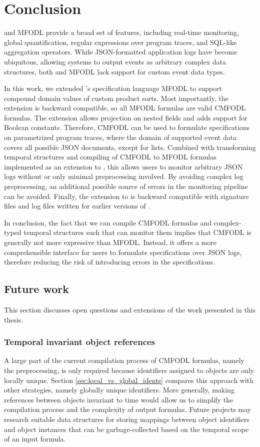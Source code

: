 \chapter{Conclusion}

\MonPoly and MFODL provide a broad set of features, including real-time monitoring, global quantification, regular expressions over program traces, and SQL-like aggregation operators. While JSON-formatted application logs have become ubiquitous, allowing systems to output events as arbitrary complex data structures, both \MonPoly and MFODL lack support for custom event data types.

In this work, we extended \MonPoly's specification language MFODL to support compound domain values of custom product sorts. Most importantly, the extension is backward compatible, so all MFODL formulas are valid CMFODL formulas. The extension allows projection on nested fields and adds support for Boolean constants. Therefore, CMFODL can be used to formulate specifications on parametrized program traces, where the domain of supported event data covers all possible JSON documents, except for lists. Combined with transforming temporal structures and compiling of CMFODL to MFODL formulas implemented as an extension to \MonPoly, this allows users to monitor arbitrary JSON logs without or only minimal preprocessing involved. By avoiding complex log preprocessing, an additional possible source of errors in the monitoring pipeline can be avoided. Finally, the extension to \MonPoly is backward compatible with signature files and log files written for earlier versions of \MonPolyN.

In conclusion, the fact that we can compile CMFODL formulas and complex-typed temporal structures such that \MonPoly can monitor them implies that CMFODL is generally not more expressive than MFODL. Instead, it offers a more comprehensible interface for users to formulate specifications over JSON logs, therefore reducing the risk of introducing errors in the specifications.

\section{Future work}
This section discusses open questions and extensions of the work presented in this thesis.

\subsection{Temporal invariant object references}
A large part of the current compilation process of CMFODL formulas, namely the preprocessing, is only required because identifiers assigned to objects are only locally unique. Section \ref{sec:local_vs_global_idents} compares this approach with other strategies, namely globally unique identifiers. More generally, making references between objects invariant to time would allow us to simplify the compilation process and the complexity of output formulas. Future projects may research suitable data structures for storing mappings between object identifiers and object instances that can be garbage-collected based on the temporal scope of an input formula.

